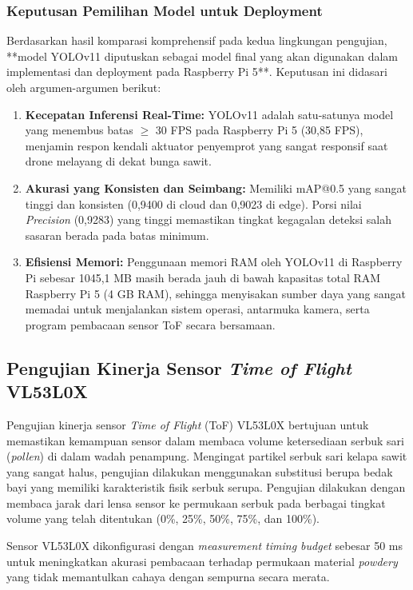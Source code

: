 \subsubsection{Keputusan Pemilihan Model untuk Deployment}
Berdasarkan hasil komparasi komprehensif pada kedua lingkungan pengujian, **model YOLOv11 diputuskan sebagai model final yang akan digunakan dalam implementasi dan deployment pada Raspberry Pi 5**. Keputusan ini didasari oleh argumen-argumen berikut:
\begin{enumerate}
  \item \textbf{Kecepatan Inferensi Real-Time:} YOLOv11 adalah satu-satunya model yang menembus batas $\ge$ 30 FPS pada Raspberry Pi 5 (30,85 FPS), menjamin respon kendali aktuator penyemprot yang sangat responsif saat drone melayang di dekat bunga sawit.
  \item \textbf{Akurasi yang Konsisten dan Seimbang:} Memiliki mAP@0.5 yang sangat tinggi dan konsisten (0,9400 di cloud dan 0,9023 di edge). Porsi nilai \emph{Precision} (0,9283) yang tinggi memastikan tingkat kegagalan deteksi salah sasaran berada pada batas minimum.
  \item \textbf{Efisiensi Memori:} Penggunaan memori RAM oleh YOLOv11 di Raspberry Pi sebesar 1045,1 MB masih berada jauh di bawah kapasitas total RAM Raspberry Pi 5 (4 GB RAM), sehingga menyisakan sumber daya yang sangat memadai untuk menjalankan sistem operasi, antarmuka kamera, serta program pembacaan sensor ToF secara bersamaan.
\end{enumerate}

\subsection{Pengujian Kinerja Sensor \emph{Time of Flight} VL53L0X}
\label{sec:uji-vl53l0x}
Pengujian kinerja sensor \emph{Time of Flight} (ToF) VL53L0X bertujuan untuk memastikan kemampuan sensor dalam membaca volume ketersediaan serbuk sari (\emph{pollen}) di dalam wadah penampung. Mengingat partikel serbuk sari kelapa sawit yang sangat halus, pengujian dilakukan menggunakan substitusi berupa bedak bayi yang memiliki karakteristik fisik serbuk serupa. Pengujian dilakukan dengan membaca jarak dari lensa sensor ke permukaan serbuk pada berbagai tingkat volume yang telah ditentukan (0\%, 25\%, 50\%, 75\%, dan 100\%).

Sensor VL53L0X dikonfigurasi dengan \emph{measurement timing budget} sebesar 50 ms untuk meningkatkan akurasi pembacaan terhadap permukaan material \emph{powdery} yang tidak memantulkan cahaya dengan sempurna secara merata.

